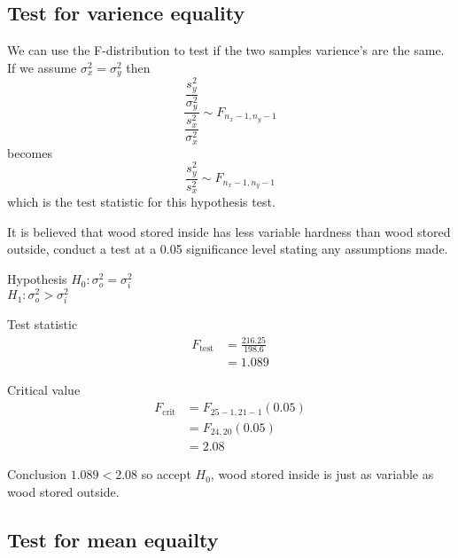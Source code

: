     \newpage
    \subsection{Test for varience equality}
        We can use the F-distribution to test if the two samples varience's are the same. If we assume $\sigma^2_x = \sigma^2_y$ then 
        $$\dfrac{\dfrac{s_y^2}{\sigma_y^2}}{\dfrac{s_x^2}{\sigma_x^2}} \sim F_{n_x-1, n_y-1} $$ 
        becomes 
        $$\dfrac{s_y^2}{s_x^2} \sim F_{n_x-1, n_y-1}$$ 
        which is the test statistic for this hypothesis test.

        \begin{example}
        {
            It is believed that wood stored inside has less variable hardness than wood stored outside, conduct a test at a 0.05 significance level stating any assumptions made.
        }

        \begin{step}{Hypothesis}
        $H_0: \sigma_o^2 = \sigma_i^2$\\ 
        $H_1: \sigma_o^2 > \sigma_i^2$
        \end{step}

        \begin{step}{Test statistic}
        \begin{align*} 
        F_{\text{test}} &= \frac{216.25}{198.6}\\ 
        &= 1.089 
        \end{align*}
        \end{step}

        \begin{step}{Critical value}
        \begin{align*} 
        F_{\text{crit}} &= F_{25-1, 21-1}(0.05)\\ 
        &= F_{24, 20}(0.05)\\ 
        &= 2.08 
        \end{align*}
        \end{step}

        \begin{step}{Conclusion}
        $1.089 < 2.08$ so accept $H_0$, wood stored inside is just as variable as wood stored outside.
        \end{step}

        \end{example}

    \newpage
    \subsection{Test for mean equailty}

